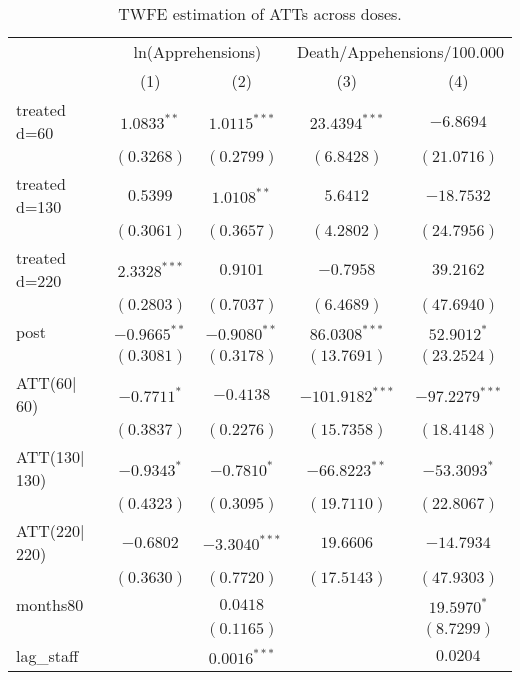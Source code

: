 
\begin{table}[!ht]
\caption{TWFE estimation of ATTs across doses.}
\begin{center}
\begin{tabular}{l c c c c}
\hline
 & \multicolumn{2}{c}{ln(Apprehensions)} & \multicolumn{2}{c}{Death/Appehensions/100.000} \\
\cline{2-3} \cline{4-5}
 & (1) & (2) & (3) & (4) \\
\hline
treated d=60   & $1.0833^{**}$   & $1.0115^{***}$  & $23.4394^{***}$   & $-6.8694$        \\
               & $(0.3268)$      & $(0.2799)$      & $(6.8428)$        & $(21.0716)$      \\
treated d=130  & $0.5399$        & $1.0108^{**}$   & $5.6412$          & $-18.7532$       \\
               & $(0.3061)$      & $(0.3657)$      & $(4.2802)$        & $(24.7956)$      \\
treated d=220  & $2.3328^{***}$  & $0.9101$        & $-0.7958$         & $39.2162$        \\
               & $(0.2803)$      & $(0.7037)$      & $(6.4689)$        & $(47.6940)$      \\
post           & $-0.9665^{**}$  & $-0.9080^{**}$  & $86.0308^{***}$   & $52.9012^{*}$    \\
               & $(0.3081)$      & $(0.3178)$      & $(13.7691)$       & $(23.2524)$      \\
ATT(60$|$60)   & $-0.7711^{*}$   & $-0.4138$       & $-101.9182^{***}$ & $-97.2279^{***}$ \\
               & $(0.3837)$      & $(0.2276)$      & $(15.7358)$       & $(18.4148)$      \\
ATT(130$|$130) & $-0.9343^{*}$   & $-0.7810^{*}$   & $-66.8223^{**}$   & $-53.3093^{*}$   \\
               & $(0.4323)$      & $(0.3095)$      & $(19.7110)$       & $(22.8067)$      \\
ATT(220$|$220) & $-0.6802$       & $-3.3040^{***}$ & $19.6606$         & $-14.7934$       \\
               & $(0.3630)$      & $(0.7720)$      & $(17.5143)$       & $(47.9303)$      \\
months80       &                 & $0.0418$        &                   & $19.5970^{*}$    \\
               &                 & $(0.1165)$      &                   & $(8.7299)$       \\
lag\_staff     &                 & $0.0016^{***}$  &                   & $0.0204$         \\

\end{tabular}
\end{center}
\end{table}
